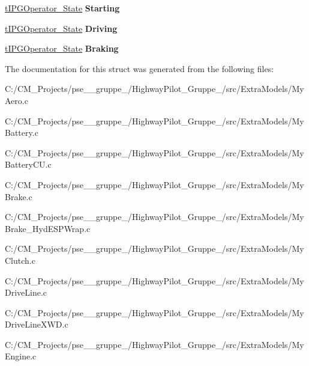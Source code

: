 \begin{DoxyCompactItemize}
\mbox{\hyperlink{structt_i_p_g_operator___state}{t\+I\+P\+G\+Operator\+\_\+\+State}} {\bfseries Starting}
\item 
\mbox{\label{structt_my_model_afce886e6a573bf4b6fa6fd4fd93d43ce}} 
\mbox{\hyperlink{structt_i_p_g_operator___state}{t\+I\+P\+G\+Operator\+\_\+\+State}} {\bfseries Driving}
\item 
\mbox{\label{structt_my_model_abd836eaa6bb4c1e8afd1d820904363e7}} 
\mbox{\hyperlink{structt_i_p_g_operator___state}{t\+I\+P\+G\+Operator\+\_\+\+State}} {\bfseries Braking}
\end{DoxyCompactItemize}


The documentation for this struct was generated from the following files\+:\begin{DoxyCompactItemize}
\item 
C\+:/\+C\+M\+\_\+\+Projects/pse\+\_\+\_\+gruppe\+\_/\+Highway\+Pilot\+\_\+\+Gruppe\+\_/src/\+Extra\+Models/My\+Aero.\+c\item 
C\+:/\+C\+M\+\_\+\+Projects/pse\+\_\+\_\+gruppe\+\_/\+Highway\+Pilot\+\_\+\+Gruppe\+\_/src/\+Extra\+Models/My\+Battery.\+c\item 
C\+:/\+C\+M\+\_\+\+Projects/pse\+\_\+\_\+gruppe\+\_/\+Highway\+Pilot\+\_\+\+Gruppe\+\_/src/\+Extra\+Models/My\+Battery\+C\+U.\+c\item 
C\+:/\+C\+M\+\_\+\+Projects/pse\+\_\+\_\+gruppe\+\_/\+Highway\+Pilot\+\_\+\+Gruppe\+\_/src/\+Extra\+Models/My\+Brake.\+c\item 
C\+:/\+C\+M\+\_\+\+Projects/pse\+\_\+\_\+gruppe\+\_/\+Highway\+Pilot\+\_\+\+Gruppe\+\_/src/\+Extra\+Models/My\+Brake\+\_\+\+Hyd\+E\+S\+P\+Wrap.\+c\item 
C\+:/\+C\+M\+\_\+\+Projects/pse\+\_\+\_\+gruppe\+\_/\+Highway\+Pilot\+\_\+\+Gruppe\+\_/src/\+Extra\+Models/My\+Clutch.\+c\item 
C\+:/\+C\+M\+\_\+\+Projects/pse\+\_\+\_\+gruppe\+\_/\+Highway\+Pilot\+\_\+\+Gruppe\+\_/src/\+Extra\+Models/My\+Drive\+Line.\+c\item 
C\+:/\+C\+M\+\_\+\+Projects/pse\+\_\+\_\+gruppe\+\_/\+Highway\+Pilot\+\_\+\+Gruppe\+\_/src/\+Extra\+Models/My\+Drive\+Line\+X\+W\+D.\+c\item 
C\+:/\+C\+M\+\_\+\+Projects/pse\+\_\+\_\+gruppe\+\_/\+Highway\+Pilot\+\_\+\+Gruppe\+\_/src/\+Extra\+Models/My\+Engine.\+c\item 

\end{DoxyCompactItemize}
